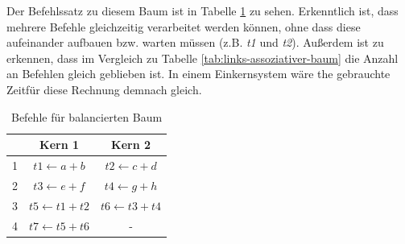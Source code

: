 Der Befehlssatz zu diesem Baum ist in Tabelle \ref{tab:balancierter-baum} zu sehen. Erkenntlich ist, dass mehrere Befehle gleichzeitig verarbeitet werden können, ohne dass diese aufeinander aufbauen bzw. warten müssen (z.B. \textit{t1} und \textit{t2}). Außerdem ist zu erkennen, dass im Vergleich zu Tabelle \ref{tab:links-assoziativer-baum} die Anzahl an Befehlen gleich geblieben ist. In einem Einkernsystem wäre the gebrauchte Zeitfür diese Rechnung demnach gleich.\\

\begin{table}
	\begin{center}
		\begin{tabular}{|c|c|c|}
			\hline  & Kern 1 & Kern 2 \\ 
			\hline 1 & $ t1 \leftarrow a + b $ & $ t2 \leftarrow c + d $ \\ 
			\hline 2 & $ t3 \leftarrow e + f $ & $ t4 \leftarrow g + h $ \\ 
			\hline 3 & $ t5 \leftarrow t1 + t2 $ & $ t6 \leftarrow t3 + t4 $\\ 
			\hline 4 & $ t7 \leftarrow t5 + t6 $ &  -\\ 
			\hline 
		\end{tabular}
	\end{center}
	\caption{Befehle für balancierten Baum}
	\label{tab:balancierter-baum}
\end{table}



